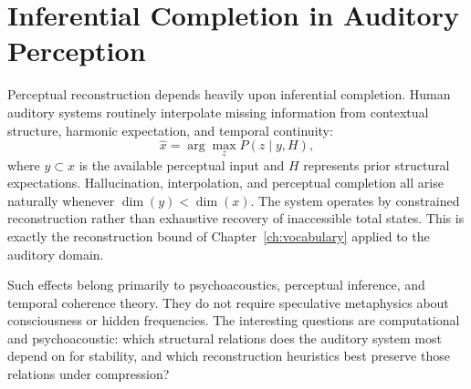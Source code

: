 \section{Inferential Completion in Auditory Perception}

Perceptual reconstruction depends heavily upon inferential completion. Human
auditory systems routinely interpolate missing information from contextual
structure, harmonic expectation, and temporal continuity:
\[
  \hat{x} = \arg\max_z P(z \mid y, H),
\]
where $y \subset x$ is the available perceptual input and $H$ represents prior
structural expectations. Hallucination, interpolation, and perceptual completion
all arise naturally whenever $\dim(y) < \dim(x)$. The system operates by
constrained reconstruction rather than exhaustive recovery of inaccessible total
states. This is exactly the reconstruction bound of Chapter~\ref{ch:vocabulary}
applied to the auditory domain.

\claimP Such effects belong primarily to psychoacoustics, perceptual inference,
and temporal coherence theory. They do not require speculative metaphysics
about consciousness or hidden frequencies. The interesting questions are
computational and psychoacoustic: which structural relations does the auditory
system most depend on for stability, and which reconstruction heuristics best
preserve those relations under compression?
